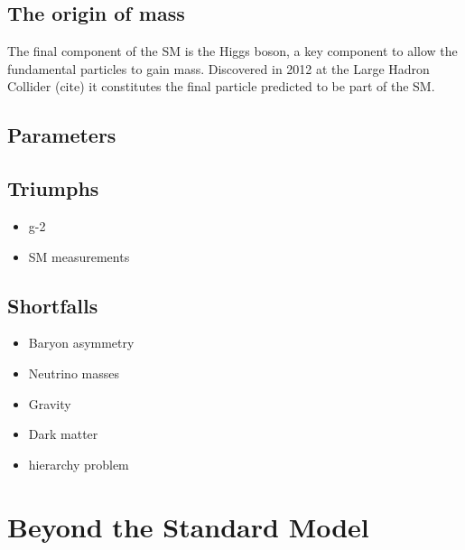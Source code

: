 \subsection{The origin of mass}
The final component of the SM is the Higgs boson, a key component to allow the fundamental particles to gain mass. Discovered in 2012 at the Large Hadron Collider (cite) it constitutes the final particle predicted to be part of the SM. 

\subsection{Parameters}


\subsection{Triumphs}

\begin{itemize}
\item g-2
\item SM measurements
\end{itemize}

\subsection{Shortfalls}
\begin{itemize}
\item Baryon asymmetry 
\item Neutrino masses
\item Gravity
\item Dark matter
\item hierarchy problem
\end{itemize}
\section{Beyond the Standard Model}

